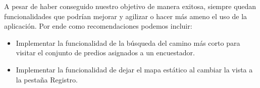\begin{recomendations}
    A pesar de haber conseguido nuestro objetivo de manera exitosa, siempre quedan funcionalidades que podrían mejorar y agilizar o hacer más ameno el uso de la aplicación.
    Por ende como recomendaciones podemos incluir:
    \begin{itemize}
        \item Implementar la funcionalidad de la búsqueda del camino más corto para visitar el conjunto de predios asignados a un encuestador.
        \item Implementar la funcionalidad de dejar el mapa estático al cambiar la vista a la pestaña Registro.
    \end{itemize}
\end{recomendations}
